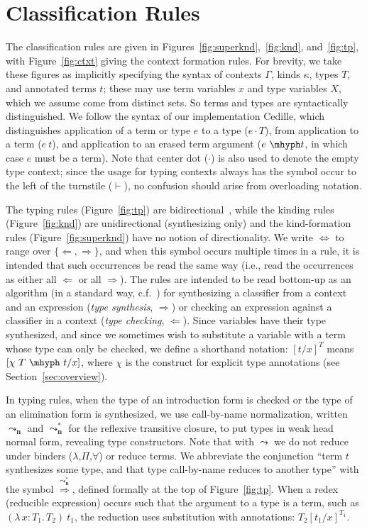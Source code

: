 \documentclass{article}
\newcommand{\abs}[4]{{#1}\, #2\! : \! #3.\, #4}
\newcommand{\leadstoc}[0]{\ensuremath{\leadsto_{\mathbf{n}}}}
\newcommand{\leadstocs}[0]{\ensuremath{\leadsto_{\mathbf{n}}^*}}
\newcommand{\tpcheck}[0]{\Leftarrow}
\newcommand{\tpsynth}[0]{\Rightarrow}
\newcommand{\tpsynthleads}[0]{\ensuremath{\overset{\leadstocs}{\Rightarrow}}}
\begin{document}
\section{Classification Rules}

The classification rules are given in
Figures~\ref{fig:superknd},~\ref{fig:knd}, and~\ref{fig:tp}, with
Figure~\ref{fig:ctxt} giving the context formation rules.
For brevity, we take these figures as implicitly specifying the syntax of
contexts \(\Gamma\), kinds $\kappa$, types $T$, and annotated terms $t$; these
may use term variables $x$ and type variables $X$, which we assume come from
distinct sets.  So terms and types are syntactically distinguished.
We follow the syntax of our implementation
Cedille, which distinguishes application of a term or type $e$ to a
type ($e \cdot T$), from application to a term ($e\ t$), and
application to an erased term argument ($e\ \mhyph t$, in which case \(e\) must
be a term).
Note that center dot (\(\cdot\)) is also used to denote the empty type context;
since the usage for typing contexts always has the symbol occur to the left of
the turnstile (\(\vdash\)), no confusion should arise from overloading notation.

The typing rules (Figure~\ref{fig:tp}) are
bidirectional~\cite{pierce+00}, while the kinding rules (Figure~\ref{fig:knd})
are unidirectional (synthesizing only) and the kind-formation rules
(Figure~\ref{fig:superknd}) have no notion of directionality.
We write $\Leftrightarrow$ to range over
$\{\tpcheck,\tpsynth\}$, and when this symbol occurs multiple times in a rule,
it is intended that such occurrences be read the same way (i.e., read the
occurrences as either all \(\tpcheck\) or all \(\tpsynth\)).
The rules are intended to be read bottom-up as an algorithm (in a standard way,
c.f.~\cite{peytonjones07,Pfe01_Lecture-Notes-on-Bidirectional-Type-Checking})
for synthesizing a classifier from a context and an expression (\emph{type
  synthesis}, \(\tpsynth\)) or checking an expression against a classifier in a
context (\emph{type checking}, \(\tpcheck\)).
Since variables have their type synthesized, and since we sometimes wish to
substitute a variable with a term whose type can only be checked, we define a
shorthand notation: \([t/x]^T\) means \([\chi\ T\ \mhyph\ t/x]\), where \(\chi\)
is the construct for explicit type annotations (see Section~\ref{sec:overview}).

In typing rules, when the type of an introduction form is checked or the type of an
elimination form is synthesized, we use call-by-name normalization, written
\(\leadstoc\) and \(\leadstocs\) for the reflexive transitive closure, to put
types in weak head normal form, revealing type constructors.
Note that with \(\leadsto\) we do not reduce under binders
(\(\lambda\),\(\Pi\),\(\forall\)) or reduce terms.
We abbreviate the conjunction ``term \(t\) synthesizes some type, and that type
call-by-name reduces to another type'' with the symbol \(\tpsynthleads\),
defined formally at the top of Figure~\ref{fig:tp}.
When a redex (reducible expression) occurs such that the argument to a type is a
term, such as \((\abs{\lambda}{x}{T_1}{T_2})\ t_1\), the reduction uses
substitution with annotations: \(T_2[t_1/x]^{T_1}\).
\end{document}

